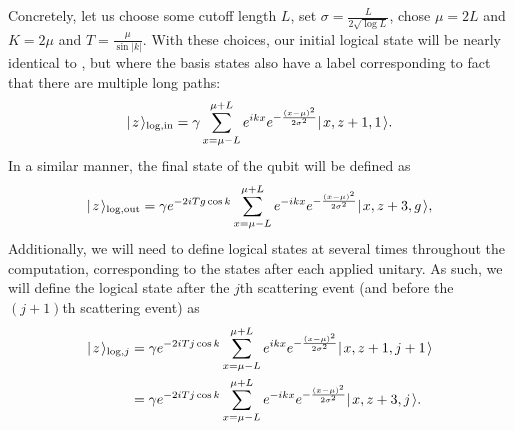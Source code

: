 \documentclass[../thesis-main/thesis-main]{subfiles}
\begin{document}
Concretely, let us choose some cutoff length $L$, set $\sigma = \frac{L}{2\sqrt{\log L}}$, chose $\mu = 2L$ and $K = 2\mu$ and $T = \frac{\mu}{\sin |k|}$.  With these choices, our initial logical state will be nearly identical to , but where the basis states also have a label corresponding to fact that there are multiple long paths:
\begin{align}
  |\mspace{2mu} z \mspace{2mu} \rangle_{\text{log},\text{in}} = \gamma \sum_{x = \mu - L}^{\mu + L} e^{ i k x} e^{ - \frac{(x-\mu)^2}{2\sigma^2}} |\mspace{2mu} x,z+1,1 \mspace{2mu} \rangle.
\end{align}
In a similar manner, the final state of the qubit will be defined as
 \begin{align}
  |\mspace{2mu} z \mspace{2mu} \rangle_{\text{log},\text{out}} = \gamma e^{- 2 i Tg \cos k} \sum_{x = \mu - L}^{\mu + L} e^{ -i k x} e^{ - \frac{(x-\mu)^2}{2\sigma^2}} |\mspace{2mu} x,z+3,g \mspace{2mu} \rangle,
\end{align}
Additionally, we will need to define logical states at several times throughout the computation, corresponding to the states after each applied unitary.  As such, we will define the logical state after the $j$th scattering event (and before the $(j+1)$th scattering event) as
\begin{align}
  |\mspace{2mu} z \mspace{2mu} \rangle_{\text{log},j} &= \gamma e^{-2i Tj \cos k}\sum_{x = \mu - L}^{\mu + L} e^{ i k x} e^{ - \frac{(x-\mu)^2}{2\sigma^2}} |\mspace{2mu} x,z+1,j+1 \mspace{2mu} \rangle \\
  &= \gamma e^{- 2 i Tj \cos k} \sum_{x = \mu - L}^{\mu + L} e^{ -i k x} e^{ - \frac{(x-\mu)^2}{2\sigma^2}} |\mspace{2mu} x,z+3,j \mspace{2mu} \rangle.
\end{align}
\end{document}
